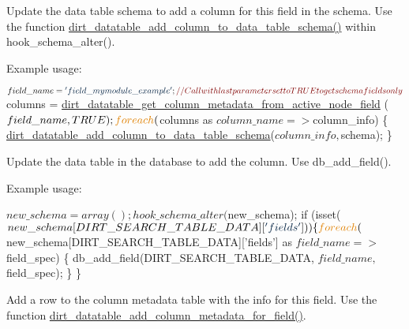 \begin{DoxyEnumerate}
\item Update the data table schema to add a column for this field in the schema. Use the function \mbox{\hyperlink{dirt__datatable_8module_ae8c7077a1381e164963200b5cd0e7a1c}{dirt\+\_\+datatable\+\_\+add\+\_\+column\+\_\+to\+\_\+data\+\_\+table\+\_\+schema()}} within hook\+\_\+schema\+\_\+alter().
\end{DoxyEnumerate}

Example usage\+:


\begin{DoxyCode}
$field\_name = \textcolor{stringliteral}{'field\_mymodule\_example'};
\textcolor{comment}{// Call with last parameter set to TRUE to get schema fields only}
$columns = \mbox{\hyperlink{dirt__datatable_8module_a76e7c95dbdc9c29ce2108bb34ae64604}{dirt\_datatable\_get\_column\_metadata\_from\_active\_node\_field}}
      ($field\_name, TRUE);
\textcolor{keywordflow}{foreach}($columns as $column\_name => $column\_info) \{
  \mbox{\hyperlink{dirt__datatable_8module_ae8c7077a1381e164963200b5cd0e7a1c}{dirt\_datatable\_add\_column\_to\_data\_table\_schema}}($column\_info
      , $schema);
\}
\end{DoxyCode}



\begin{DoxyEnumerate}
\item Update the data table in the database to add the column. Use db\+\_\+add\+\_\+field().
\end{DoxyEnumerate}

Example usage\+:


\begin{DoxyCode}
$new\_schema = array();
hook\_schema\_alter($new\_schema);
\textcolor{keywordflow}{if} (isset($new\_schema[DIRT\_SEARCH\_TABLE\_DATA][\textcolor{stringliteral}{'fields'}])) \{
  \textcolor{keywordflow}{foreach}($new\_schema[DIRT\_SEARCH\_TABLE\_DATA][\textcolor{stringliteral}{'fields'}] as $field\_name => $field\_spec) \{
    db\_add\_field(DIRT\_SEARCH\_TABLE\_DATA, $field\_name, $field\_spec);
  \}
\}
\end{DoxyCode}



\begin{DoxyEnumerate}
\item Add a row to the column metadata table with the info for this field. Use the function \mbox{\hyperlink{dirt__datatable_8module_a7a6ec0b5a56373d83bab71bb860c9203}{dirt\+\_\+datatable\+\_\+add\+\_\+column\+\_\+metadata\+\_\+for\+\_\+field()}}.
\end{DoxyEnumerate}

